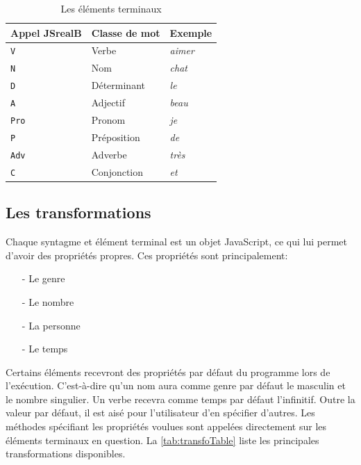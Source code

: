 \documentclass[11pt]{article} %
\newcommand{\system}[1]{\textsf{#1}}
\newcommand{\JSB}{\system{JSrealB}}
\newcommand{\real}[1]{\emph{#1}}
\begin{document}
\begin{table}[ht]
\centering
\caption{Les éléments terminaux}
\label{tab:terminauxTable}
\begin{tabular}{|l|l|l|}
\hline 
\multicolumn{1}{|c}{Appel \JSB{}}  & \multicolumn{1}{|c}{Classe de mot} & \multicolumn{1}{|c|}{Exemple}\\
\hline 
\hline 
\texttt{V} & Verbe & \real{aimer}\\
\hline 
\texttt{N} & Nom & \real{chat}\\
\hline 
\texttt{D} & Déterminant & \real{le}\\
\hline 
\texttt{A} & Adjectif & \real{beau}\\
\hline 
\texttt{Pro} & Pronom & \real{je}\\
\hline 
\texttt{P} & Préposition & \real{de}\\
\hline 
\texttt{Adv} & Adverbe & \real{très}\\
\hline 
\texttt{C} & Conjonction & \real{et}\\
\hline 
\end{tabular}
\end{table}

\pagebreak{}
\subsection{Les transformations}

Chaque syntagme et élément terminal est un objet JavaScript, ce qui
lui permet d'avoir des propriétés propres. Ces propriétés sont principalement:
\begin{itemize}
\item[-] Le genre
\item[-] Le nombre
\item[-] La personne
\item[-] Le temps
\end{itemize}
Certains éléments recevront des propriétés par défaut du programme
lors de l'exécution. C'est-à-dire qu'un nom aura comme genre par défaut
le masculin et le nombre singulier. Un verbe recevra comme temps par
défaut l'infinitif. Outre la valeur par défaut, il est aisé pour
l'utilisateur d'en spécifier d'autres. Les méthodes spécifiant les
propriétés voulues sont appelées directement sur les éléments terminaux
en question. La \autoref{tab:transfoTable} liste les principales transformations
disponibles.
\end{document}
